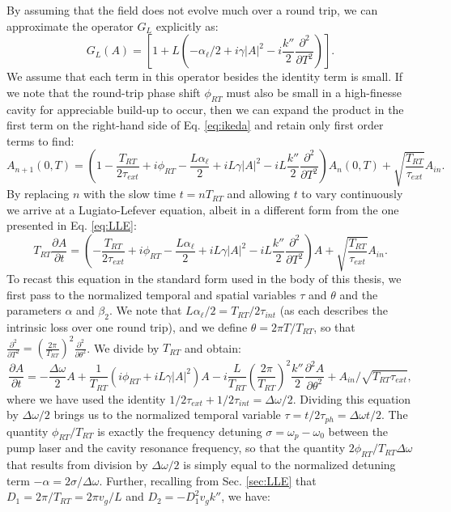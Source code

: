 By assuming that the field does not evolve much over a round trip, we can approximate the operator $G_L$ explicitly as:
\begin{equation}
G_L(A)=\left[1+L\left(-\alpha_\ell/2 +i\gamma|A|^2-i\frac{k''}{2} \frac{\partial^2 }{\partial T^2}\right)\right].
\end{equation}
We assume that each term in this operator besides the identity term is small. If we note that the round-trip phase shift $\phi_{RT}$ must also be small in a high-finesse cavity for appreciable build-up to occur, then we can expand the product in the first term on the right-hand side of Eq. \ref{eq:ikeda} and retain only first order terms to find:
\begin{equation}
A_{n+1}(0,T)=\left(1-\frac{T_{RT}}{2\tau_{ext}}+i\phi_{RT}-\frac{L\alpha_\ell}{2}+iL\gamma|A|^2-iL\frac{k''}{2} \frac{\partial^2 }{\partial T^2}\right)A_n(0,T)+\sqrt{\frac{T_{RT}}{\tau_{ext}}}A_{in}. \label{eq:ikedaxp}
\end{equation}
By replacing $n$ with the slow time $t=n T_{RT}$ and allowing $t$ to vary continuously we arrive at a Lugiato-Lefever equation, albeit in a different form from the one presented in Eq. \ref{eq:LLE}:
\begin{equation}
T_{RT}\frac{\partial A}{\partial t}=\left(-\frac{T_{RT}}{2\tau_{ext}}+i\phi_{RT}-\frac{L\alpha_\ell}{2}+iL\gamma|A|^2-iL\frac{k''}{2} \frac{\partial^2 }{\partial T^2}\right)A+\sqrt{\frac{T_{RT}}{\tau_{ext}}}A_{in}.
\end{equation}
To recast this equation in the standard form used in the body of this thesis, we first pass to the normalized temporal and spatial variables $\tau$ and $\theta$ and the parameters $\alpha$ and $\beta_2$. We note that $L\alpha_\ell/2=T_{RT}/2\tau_{int}$ (as each describes the intrinsic loss over one round trip), and we define $\theta=2\pi T/T_{RT}$, so that $\frac{\partial^2}{\partial T^2}=\left(\frac{2\pi}{T_{RT}}\right)^2\frac{\partial^2}{\partial\theta^2}$. We divide by $T_{RT}$ and obtain:
\begin{equation}
\frac{\partial A}{\partial t}=-\frac{\Delta\omega}{2}A+\frac{1}{T_{RT}}\left(i\phi_{RT}+iL\gamma|A|^2\right)A-i\frac{L}{T_{RT}}\left(\frac{2\pi}{T_{RT}}\right)^2\frac{k''}{2} \frac{\partial^2 A }{\partial \theta^2}+A_{in}/\sqrt{T_{RT}\tau_{ext}},
\end{equation}
where we have used the identity $1/2\tau_{ext}+1/2\tau_{int}=\Delta\omega/2$. Dividing this equation by $\Delta\omega/2$ brings us to the normalized temporal variable $\tau=t/2\tau_{ph}=\Delta\omega t/2$. The quantity $\phi_{RT}/T_{RT}$ is exactly the frequency detuning $\sigma=\omega_p-\omega_0$ between the pump laser and the cavity resonance frequency, so that the quantity $2\phi_{RT}/T_{RT}\Delta\omega$ that results from division by $\Delta\omega/2$ is simply equal to the normalized detuning term $-\alpha=2\sigma/\Delta\omega$. Further, recalling from Sec. \ref{sec:LLE} that $D_1=2\pi/T_{RT}=2\pi v_g/L$ and $D_2=-D_1^2v_gk''$, we have:
